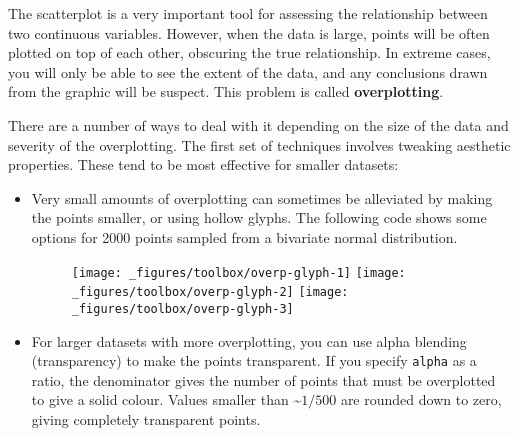 The scatterplot is a very important tool for assessing the relationship
between two continuous variables. However, when the data is large,
points will be often plotted on top of each other, obscuring the true
relationship. In extreme cases, you will only be able to see the extent
of the data, and any conclusions drawn from the graphic will be suspect.
This problem is called \textbf{overplotting}. 

There are a number of ways to deal with it depending on the size of the
data and severity of the overplotting. The first set of techniques
involves tweaking aesthetic properties. These tend to be most effective
for smaller datasets:

\begin{itemize}
\item
  Very small amounts of overplotting can sometimes be alleviated by
  making the points smaller, or using hollow glyphs. The following code
  shows some options for 2000 points sampled from a bivariate normal
  distribution. 

\begin{Shaded}
\begin{Highlighting}[]
\StringTok{ }\NormalTok{(} \NormalTok{(}\NormalTok{), } \NormalTok{(}\NormalTok{))}
\StringTok{ }\StringTok{ }\NormalTok{(}\NormalTok{) +}\StringTok{ }\NormalTok{(}\NormalTok{)}
\StringTok{ }\NormalTok{()}
\StringTok{ }\NormalTok{(} \NormalTok{) }
\StringTok{ }\NormalTok{(} \NormalTok{) }
\end{Highlighting}
\end{Shaded}

  \begin{figure}[H]
    \texttt{[image: \_figures/toolbox/overp-glyph-1]}%
    \texttt{[image: \_figures/toolbox/overp-glyph-2]}%
    \texttt{[image: \_figures/toolbox/overp-glyph-3]}
  \end{figure}
\item
  For larger datasets with more overplotting, you can use alpha blending
  (transparency) to make the points transparent. If you specify
  \texttt{alpha} as a ratio, the denominator gives the number of points
  that must be overplotted to give a solid colour. Values smaller than
  \textasciitilde{}\(1/500\) are rounded down to zero, giving completely
  transparent points.  
   


\end{itemize}
